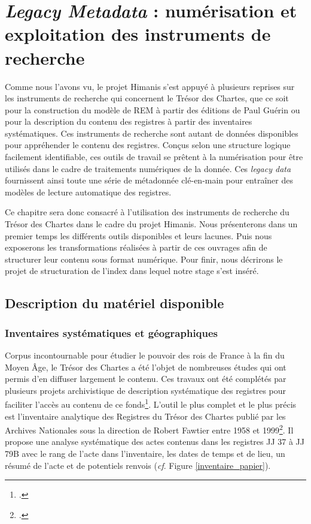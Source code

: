 \documentclass[a4paper,12pt,twoside]{book}
\begin{document}
	
	\chapter{\textit{Legacy Metadata} : numérisation et exploitation des instruments de recherche}
	
	Comme nous l'avons vu, le projet Himanis s'est appuyé à plusieurs reprises sur les instruments de recherche qui concernent le Trésor des Chartes, que ce soit pour la construction du modèle de REM à partir des éditions de Paul Guérin ou pour la description du contenu des registres à partir des inventaires systématiques. Ces instruments de recherche sont autant de données disponibles pour appréhender le contenu des registres. Conçus selon une structure logique facilement identifiable, ces outils de travail se prêtent à la numérisation pour être utilisés dans le cadre de traitements numériques de la donnée. Ces \textit{legacy data} fournissent ainsi toute une série de métadonnée clé-en-main pour entraîner des modèles de lecture automatique des registres.
	
	Ce chapitre sera donc consacré à l'utilisation des instruments de recherche du Trésor des Chartes dans le cadre du projet Himanis. Nous présenterons dans un premier temps les différents outils disponibles et leurs lacunes. Puis nous exposerons les transformations réalisées à partir de ces ouvrages afin de structurer leur contenu sous format numérique. Pour finir, nous décrirons le projet de structuration de l'index dans lequel notre stage s'est inséré.
	
	\section{Description du matériel disponible}
	
	\subsection{Inventaires systématiques et géographiques}
	
	Corpus incontournable pour étudier le pouvoir des rois de France à la fin du Moyen Âge, le Trésor des Chartes a été l'objet de nombreuses études qui ont permis d'en diffuser largement le contenu. Ces travaux ont été complétés par plusieurs projets archivistique de description systématique des registres pour faciliter l'accès au contenu de ce fonds\footcite{stutzmann_recherche_2017}. L'outil le plus complet et le plus précis est l'inventaire analytique des Registres du Trésor des Chartes publié par les Archives Nationales sous la direction de Robert Fawtier entre 1958 et 1999\footcite{glenisson_registres_1958}. Il propose une analyse systématique des actes contenus dans les registres JJ 37 à JJ 79B avec le rang de l'acte dans l'inventaire, les dates de temps et de lieu, un résumé de l'acte et de potentiels renvois (\textit{cf}. Figure \ref{inventaire_papier}).
	
\end{document}
